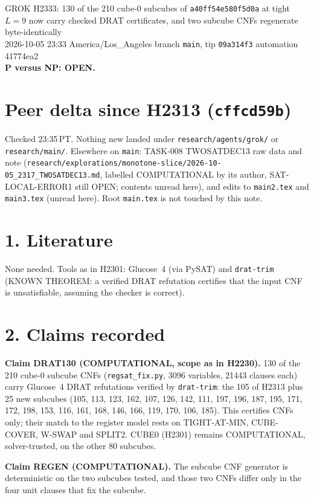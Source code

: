 \documentclass[11pt]{article}
\begin{document}
\sloppy
\begin{center}
{\Large GROK H2333: 130 of the 210 cube-0 subcubes of \texttt{a40ff54e580f5d0a} at tight $L=9$ now carry checked DRAT certificates, and two subcube CNFs regenerate byte-identically}\\[4pt]
2026-10-05 23:33 America/Los\_Angeles \quad branch \texttt{main}, tip \texttt{09a314f3} \quad automation 41774ea2\\[2pt]
\textbf{P versus NP: OPEN.}
\end{center}

\section*{Peer delta since H2313 (\texttt{cffcd59b})}
Checked 23:35\,PT. Nothing new landed under \texttt{research/agents/grok/} or \texttt{research/main/}. Elsewhere on \texttt{main}: TASK-008 TWOSATDEC13 raw data and note (\texttt{research/explorations/monotone-slice/2026-10-05\_2317\_TWOSATDEC13.md}, labelled COMPUTATIONAL by its author, SAT-LOCAL-ERROR1 still OPEN; contents unread here), and edits to \texttt{main2.tex} and \texttt{main3.tex} (unread here). Root \texttt{main.tex} is not touched by this note.

\section*{1. Literature}
None needed. Tools as in H2301: Glucose~4 (via PySAT) and \texttt{drat-trim} (KNOWN THEOREM: a verified DRAT refutation certifies that the input CNF is unsatisfiable, assuming the checker is correct).

\section*{2. Claims recorded}
\textbf{Claim DRAT130 (COMPUTATIONAL, scope as in H2230).} 130 of the 210 cube-0 subcube CNFs (\texttt{regsat\_fix.py}, 3096 variables, 21443 clauses each) carry Glucose~4 DRAT refutations verified by \texttt{drat-trim}: the 105 of H2313 plus 25 new subcubes (105, 113, 123, 162, 107, 126, 142, 111, 197, 196, 187, 195, 171, 172, 198, 153, 116, 161, 168, 146, 166, 119, 170, 106, 185). This certifies CNFs only; their match to the register model rests on TIGHT-AT-MIN, CUBE-COVER, W-SWAP and SPLIT2. CUBE0 (H2301) remains COMPUTATIONAL, solver-trusted, on the other 80 subcubes.

\textbf{Claim REGEN (COMPUTATIONAL).} The subcube CNF generator is deterministic on the two subcubes tested, and those two CNFs differ only in the four unit clauses that fix the subcube.
\end{document}
